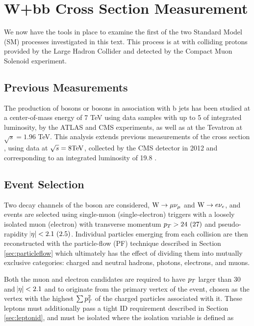 
\chapter{W+bb Cross Section Measurement}\label{sec:wbbxc}

We now have the tools in place to examine the first of the
 two Standard Model (SM) processes investigated in this text.
This process is \ppwbb at  \TeV with colliding protons
 provided by the Large Hadron Collider and detected
 by the Compact Muon Solenoid experiment. 

\section{Previous Measurements}

The production of \z bosons
 \cite{Chatrchyan:2012vr,Chatrchyan:2014dha,Chatrchyan:2013zja,Aad:2011jn,Aad:2014dvb}
 or \w bosons \cite{Chatrchyan:2013uza,Aad:2013vka}
 in association with b jets has been 
 studied at a center-of-mass
 energy of 7 TeV using data samples with up
 to 5 \fbinv of integrated luminosity,
 by the ATLAS and CMS experiments, 
 as well as at 
 the Tevatron \cite{WbbTevD0,WbbTevCDF} at $\sqrt{s}=1.96$ TeV. 
This analysis extends previous measurements of the \wbb cross section \cite{Chatrchyan:2013uza},
 using data at $\sqrt{s}=8 \mathrm{TeV}$, collected by the CMS detector in 2012 
 and corresponding to an integrated luminosity of 19.8 \fbinv \cite{ref:CMSLumiCalc}.

\section{Event Selection}

 Two decay channels of the \w boson are considered,
  $\mathrm{W}\rightarrow \mu\nu_\mu$ and $\mathrm{W}\rightarrow e\nu_e$,
 and events are selected using
 single-muon (single-electron) triggers with a
 loosely isolated muon (electron)
 with transverse momentum $p_T>24~(27)$ \GeV
 and pseudo-rapidity $\abs{\eta}<2.1~(2.5)$.
Individual particles emerging from each collision are then reconstructed with the
 particle-flow (PF) technique described in Section \ref{sec:particleflow}
 which ultimately has the effect of dividing them 
 into mutually exclusive categories:
 charged and neutral hadrons, photons, electrons, and muons.

Both the muon and electron candidates are required to have 
 $p_T$ larger than 30 \GeV and $\abs{\eta}<2.1$ and
 to originate from the primary vertex of the event,
 chosen as the vertex with the highest $\sum p_T^2$
 of the charged particles associated with it.
These leptons must additionally pass a tight ID requirement 
 described in Section \ref{sec:leptonid},
 and  must be isolated where
 the isolation variable is defined as

